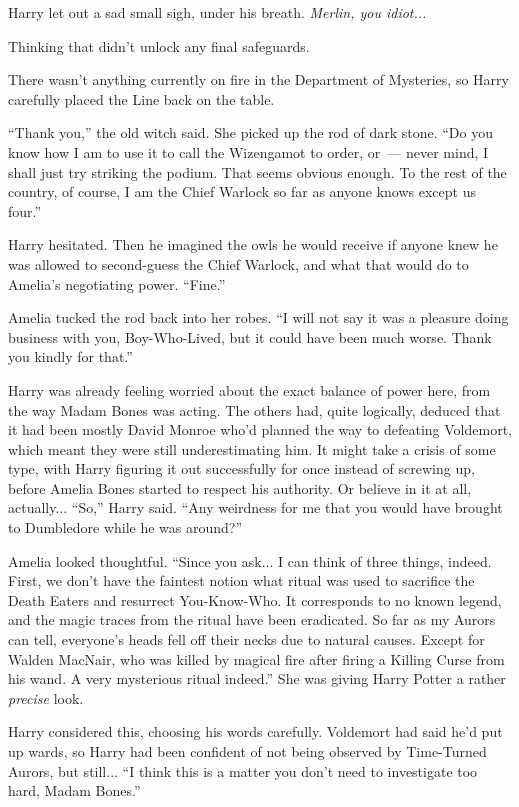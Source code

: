 Harry let out a sad small sigh, under his breath. \emph{Merlin, you idiot...}

Thinking that didn't unlock any final safeguards.

There wasn't anything currently on fire in the Department of Mysteries, so Harry carefully placed the Line back on the table.

``Thank you,'' the old witch said. She picked up the rod of dark stone. ``Do you know how I am to use it to call the Wizengamot to order, or~--- never mind, I shall just try striking the podium. That seems obvious enough. To the rest of the country, of course, I am the Chief Warlock so far as anyone knows except us four.''

Harry hesitated. Then he imagined the owls he would receive if anyone knew he was allowed to second-guess the Chief Warlock, and what that would do to Amelia's negotiating power. ``Fine.''

Amelia tucked the rod back into her robes. ``I will not say it was a pleasure doing business with you, Boy-Who-Lived, but it could have been much worse. Thank you kindly for that.''

Harry was already feeling worried about the exact balance of power here, from the way Madam Bones was acting. The others had, quite logically, deduced that it had been mostly David Monroe who'd planned the way to defeating Voldemort, which meant they were still underestimating him. It might take a crisis of some type, with Harry figuring it out successfully for once instead of screwing up, before Amelia Bones started to respect his authority. Or believe in it at all, actually... ``So,'' Harry said. ``Any weirdness for me that you would have brought to Dumbledore while he was around?''

Amelia looked thoughtful. ``Since you ask... I can think of three things, indeed. First, we don't have the faintest notion what ritual was used to sacrifice the Death Eaters and resurrect You-Know-Who. It corresponds to no known legend, and the magic traces from the ritual have been eradicated. So far as my Aurors can tell, everyone's heads fell off their necks due to natural causes. Except for Walden MacNair, who was killed by magical fire after firing a Killing Curse from his wand. A very mysterious ritual indeed.'' She was giving Harry Potter a rather \emph{precise} look.

Harry considered this, choosing his words carefully. Voldemort had said he'd put up wards, so Harry had been confident of not being observed by Time-Turned Aurors, but still... ``I think this is a matter you don't need to investigate too hard, Madam Bones.''

